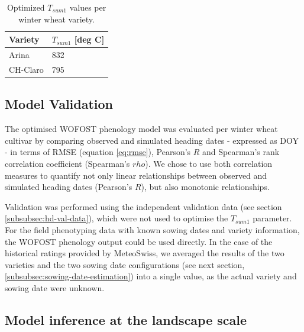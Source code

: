 \begin{table}[H]
\caption{Optimized $T_{sum1}$ values per winter wheat variety.}
\label{tab:tsum1-values}
\centering
\begin{tabular}{@{}ll@{}}
\toprule
Variety  & $T_{sum1}$ [deg C] \\ \midrule
Arina    & 832   \\
CH-Claro & 795   \\ \bottomrule
\end{tabular}
\end{table}

\subsection{Model Validation}
The optimised \gls{WOFOST} phenology model was evaluated per winter wheat cultivar by comparing observed and simulated heading dates - expressed as \gls{DOY} - in terms of \gls{RMSE} (equation \ref{eq:rmse}), Pearson's $R$ and Spearman's rank correlation coefficient (Spearman's $rho$). We chose to use both correlation measures to quantify not only linear relationships between observed and simulated heading dates (Pearson's $R$), but also monotonic relationships.

Validation was performed using the independent validation data (see section \ref{subsubsec:hd-val-data}), which were not used to optimise the $T_{sum1}$ parameter. For the field phenotyping data with known sowing dates and variety information, the \gls{WOFOST} phenology output could be used directly. In the case of the historical ratings provided by MeteoSwiss, we averaged the results of the two varieties and the two sowing date configurations (see next section, \ref{subsubsec:sowing-date-estimation}) into a single value, as the actual variety and sowing date were unknown.

\subsection{Model inference at the landscape scale}

